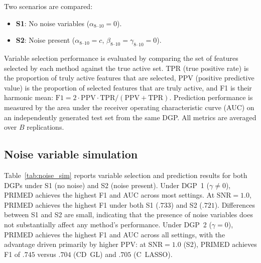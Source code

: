 \documentclass[referee,lineno,pdflatex,sn-vancouver-num]{sn-jnl}
\begin{document}
Two scenarios are compared:
\begin{itemize}
  \item \textbf{S1}: No noise variables ($\alpha_{8\text{--}10} = 0$).
  \item \textbf{S2}: Noise present ($\alpha_{8\text{--}10} = c$, $\beta_{8\text{--}10} = \gamma_{8\text{--}10} = 0$).
\end{itemize}

Variable selection performance is evaluated by comparing the set of features selected by each method against the true active set.
TPR (true positive rate) is the proportion of truly active features that are selected, PPV (positive predictive value) is the proportion of selected features that are truly active, and F1 is their harmonic mean: $\mathrm{F1} = 2 \cdot \mathrm{PPV} \cdot \mathrm{TPR} / (\mathrm{PPV} + \mathrm{TPR})$.
Prediction performance is measured by the area under the receiver operating characteristic curve (AUC) on an independently generated test set from the same DGP.
All metrics are averaged over $B$ replications.

\subsection{Noise variable simulation}\label{sec:noise_sim}

Table~\ref{tab:noise_sim} reports variable selection and prediction results for both DGPs under S1 (no noise) and S2 (noise present).
Under DGP~1 ($\gamma \neq 0$), PRIMED achieves the highest F1 and AUC across most settings.
At $\mathrm{SNR} = 1.0$, PRIMED achieves the highest F1 under both S1 ($.733$) and S2 ($.721$).
Differences between S1 and S2 are small, indicating that the presence of noise variables does not substantially affect any method's performance.
Under DGP~2 ($\gamma = 0$), PRIMED achieves the highest F1 and AUC across all settings, with the advantage driven primarily by higher PPV: at $\mathrm{SNR} = 1.0$ (S2), PRIMED achieves F1 of $.745$ versus $.704$ (CD~GL) and $.705$ (C~LASSO).
\end{document}

